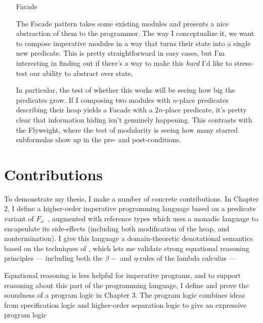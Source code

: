 \begin{itemize}
\item[Facade]

The Facade pattern takes some existing modules and presents a nice
abstraction of them to the programmer. The way I conceptualize it, we
want to compose imperative modules in a way that turns their state
into a single new predicate. This is pretty straightforward in easy
cases, but I'm interesting in finding out if there's a way to make
this \emph{hard} I'd like to stress-test our ability to abstract over
state.

In particular, the test of whether this works will be seeing how big
the predicates grow. If I composing two modules with $n$-place
predicates describing their heap yields a Facade with a $2n$-place
predicate, it's pretty clear that information hiding isn't genuinely
happening. This contrasts with the Flyweight, where the test of
modularity is seeing how many starred subformulas show up in the
pre- and post-conditions. 

\end{itemize}

\section{Contributions}

To demonstrate my thesis, I make a number of concrete contributions.
In Chapter 2, I define a higher-order imperative programming language
based on a predicate variant of $F_\omega$~\citep{fomega}, augmented
with reference types which uses a monadic language to encapsulate its
side-effects (including both modification of the heap, and
nontermination). I give this language a domain-theoretic denotational
semantics based on the techniques of \citet{smyth-plotkin}, which lets
me validate strong equational reasoning principles --- including both
the $\beta-$ and $\eta$-rules of the lambda calculus ---

Equational reasoning is less helpful for imperative programs, and to
support reasoning about this part of the programming language, I
define and prove the soundness of a program logic in Chapter 3. The
program logic combines ideas from specification logic and higher-order
separation logic to give an expressive program logic 
